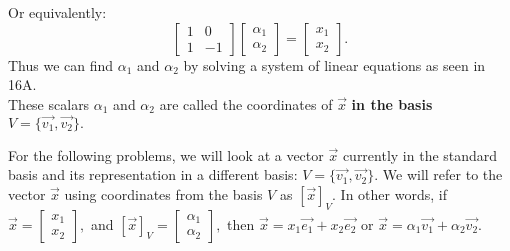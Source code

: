 Or equivalently:
\[
  \begin{bmatrix}
    1 & 0 \\
    1 & -1
  \end{bmatrix}
  \begin{bmatrix} \alpha_1 \\ \alpha_2 \end{bmatrix} = \begin{bmatrix} x_1 \\ x_2 \end{bmatrix}
.\]
Thus we can find $\alpha_1$ and $\alpha_2$ by solving a system of linear equations as seen in 16A. \\
These scalars $\alpha_1$ and $\alpha_2$ are called the coordinates of $\vec{x}$ \textbf{in the basis} $V = \{\vec{v_1}, \vec{v_2} \}.$

For the following problems, we will look at a vector $\vec{x}$ currently in the standard basis 
and its representation in a different basis: $V = \{\vec{v_1}, \vec{v_2} \}.$ \vskip 4pt
We will refer to the vector $\vec{x}$ using coordinates from the basis $V$ as $[\vec{x}]_V$. In other words, \vskip 3pt 
if $\vec{x} = \begin{bmatrix} x_1 \\ x_2 \end{bmatrix},$ and $[\vec{x}]_V = \begin{bmatrix} \alpha_1 \\ \alpha_2 \end{bmatrix},$ then $\vec{x} = x_1 \vec{e_1} + x_2 \vec{e_2}$ or $\vec{x} = \alpha_1 \vec{v_1} + \alpha_2 \vec{v_2}.$


